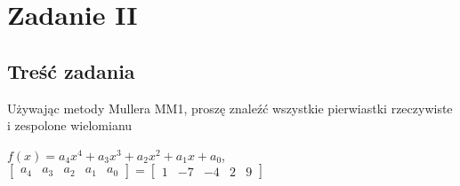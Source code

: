 \documentclass[11pt, oneside]{article}   	%
\begin{document}
\section{Zadanie II}
\subsection{Treść zadania}
Używając metody Mullera MM1, proszę znaleźć wszystkie pierwiastki rzeczywiste i zespolone wielomianu
\begin{center}
$f(x) = a_{4}x^4+a_{3}x^3+a_{2}x^2+a_{1}x+a_{0}$,  
$
\left[
\begin{array}{ccccc}
       a_{4} & a_{3} & a_{2} & a_{1} & a_{0}
\end{array}
\right]
=
\left[
\begin{array}{ccccc}
       1 & -7 & -4 & 2 & 9
\end{array}
\right]$
\end{center}
\end{document}
